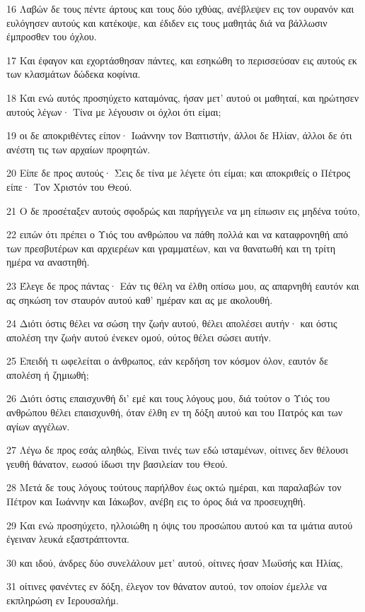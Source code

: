 \par 16 Λαβών δε τους πέντε άρτους και τους δύο ιχθύας, ανέβλεψεν εις τον ουρανόν και ευλόγησεν αυτούς και κατέκοψε, και έδιδεν εις τους μαθητάς διά να βάλλωσιν έμπροσθεν του όχλου.
\par 17 Και έφαγον και εχορτάσθησαν πάντες, και εσηκώθη το περισσεύσαν εις αυτούς εκ των κλασμάτων δώδεκα κοφίνια.
\par 18 Και ενώ αυτός προσηύχετο καταμόνας, ήσαν μετ' αυτού οι μαθηταί, και ηρώτησεν αυτούς λέγων· Τίνα με λέγουσιν οι όχλοι ότι είμαι;
\par 19 οι δε αποκριθέντες είπον· Ιωάννην τον Βαπτιστήν, άλλοι δε Ηλίαν, άλλοι δε ότι ανέστη τις των αρχαίων προφητών.
\par 20 Είπε δε προς αυτούς· Σεις δε τίνα με λέγετε ότι είμαι; και αποκριθείς ο Πέτρος είπε· Τον Χριστόν του Θεού.
\par 21 Ο δε προσέταξεν αυτούς σφοδρώς και παρήγγειλε να μη είπωσιν εις μηδένα τούτο,
\par 22 ειπών ότι πρέπει ο Υιός του ανθρώπου να πάθη πολλά και να καταφρονηθή από των πρεσβυτέρων και αρχιερέων και γραμματέων, και να θανατωθή και τη τρίτη ημέρα να αναστηθή.
\par 23 Έλεγε δε προς πάντας· Εάν τις θέλη να έλθη οπίσω μου, ας απαρνηθή εαυτόν και ας σηκώση τον σταυρόν αυτού καθ' ημέραν και ας με ακολουθή.
\par 24 Διότι όστις θέλει να σώση την ζωήν αυτού, θέλει απολέσει αυτήν· και όστις απολέση την ζωήν αυτού ένεκεν ομού, ούτος θέλει σώσει αυτήν.
\par 25 Επειδή τι ωφελείται ο άνθρωπος, εάν κερδήση τον κόσμον όλον, εαυτόν δε απολέση ή ζημιωθή;
\par 26 Διότι όστις επαισχυνθή δι' εμέ και τους λόγους μου, διά τούτον ο Υιός του ανθρώπου θέλει επαισχυνθή, όταν έλθη εν τη δόξη αυτού και του Πατρός και των αγίων αγγέλων.
\par 27 Λέγω δε προς εσάς αληθώς, Είναι τινές των εδώ ισταμένων, οίτινες δεν θέλουσι γευθή θάνατον, εωσού ίδωσι την βασιλείαν του Θεού.
\par 28 Μετά δε τους λόγους τούτους παρήλθον έως οκτώ ημέραι, και παραλαβών τον Πέτρον και Ιωάννην και Ιάκωβον, ανέβη εις το όρος διά να προσευχηθή.
\par 29 Και ενώ προσηύχετο, ηλλοιώθη η όψις του προσώπου αυτού και τα ιμάτια αυτού έγειναν λευκά εξαστράπτοντα.
\par 30 και ιδού, άνδρες δύο συνελάλουν μετ' αυτού, οίτινες ήσαν Μωϋσής και Ηλίας,
\par 31 οίτινες φανέντες εν δόξη, έλεγον τον θάνατον αυτού, τον οποίον έμελλε να εκπληρώση εν Ιερουσαλήμ.
